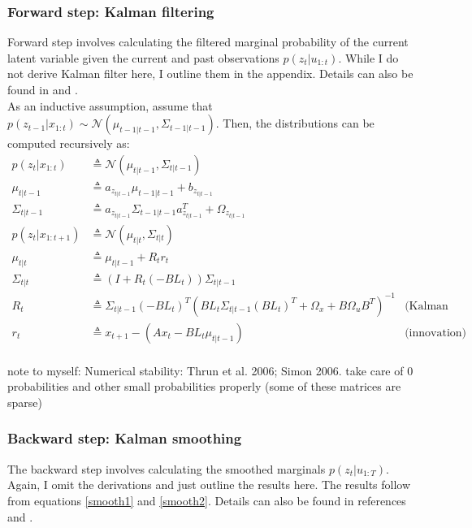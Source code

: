 \documentclass[11pt, reqno]{article}
\numberwithin{equation}{section}
\begin{document}
\subsubsection{Forward step: Kalman filtering}
Forward step involves calculating the filtered marginal probability of the current latent variable given the current and past observations $p(z_t | u_{1:t})$. While I do not derive Kalman filter here, I outline them in the appendix. Details can also be found in \cite{Murphy2012} and \cite{Jordan2007}. \\

As an inductive assumption, assume that $p(z_{t-1} | x_{1:t}) \sim  \mathcal{N}(\mu_{t-1|t-1}, \Sigma_{t-1|t-1})$. Then, the distributions can be computed recursively as:
\begin{align*}
p(z_{t} | x_{1:t}) &\triangleq  \mathcal{N}\left( \mu_{t|t-1},  \Sigma_{t|t-1}\right)\\
\mu_{t|t-1} &\triangleq a_{z_{t|t-1}}\mu_{t-1|t-1} + b_{z_{t|t-1}} \\
\Sigma_{t|t-1} &\triangleq  a_{z_{t|t-1}} \Sigma_{t-1|t-1} a_{z_{t|t-1}}^T + \Omega_{z_{t|t-1}}\\
p(z_{t} | x_{1:t+1}) &\triangleq \mathcal{N}\left( \mu_{t|t},  \Sigma_{t|t}\right)\\
\mu_{t|t} &\triangleq \mu_{t|t-1} + R_{t}r_{t} \\
\Sigma_{t|t} &\triangleq  \left( I + R_{t}(-BL_t) \right) \Sigma_{t|t-1}\\
R_{t} 
&\triangleq \Sigma_{t|t-1} (-BL_t)^T  \left(BL_t \Sigma_{t|t-1}(BL_t)^T + \Omega_x + B \Omega_u B^T  \right)^{-1} &\text{(Kalman filter)} \\
r_{t} &\triangleq  x_{t+1} - (Ax_{t} - BL_t \mu_{t|t-1}) &\text{(innovation)}\\
\end{align*}

note to myself: Numerical stability: Thrun et al. 2006; Simon 2006.  take care of 0 probabilities and other small probabilities properly (some of these matrices are sparse)

\subsubsection{Backward step: Kalman smoothing}
The backward step involves calculating the smoothed marginals  $p(z_t | u_{1:T})$. Again, I omit the derivations and just outline the results here. The results follow from equations \ref{smooth1} and \ref{smooth2}. Details can also be found in references \cite{Murphy2012} and \cite{Jordan2007}. \\
\end{document}
